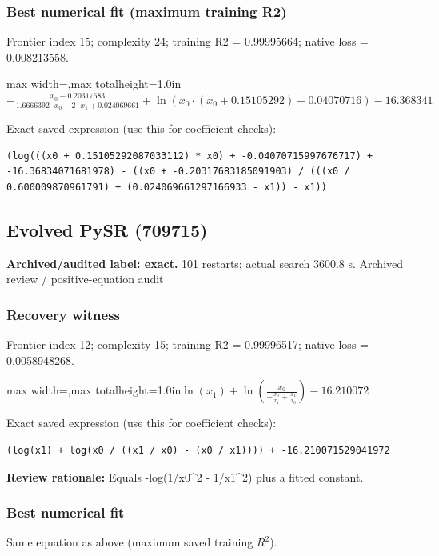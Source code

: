 \documentclass[10pt,letterpaper,landscape]{article}
\begin{document}
\begin{minipage}[t]{0.485\textwidth}
\subsubsection*{Best numerical fit (maximum training R2)}
Frontier index 15; complexity 24; training R2 = 0.99995664; native loss = 0.008213558.
\begin{center}\begin{adjustbox}{max width=\linewidth,max totalheight=1.0in}$\displaystyle - \frac{x_{0} - 0.20317683}{1.6666392 \cdot x_{0} - 2 \cdot x_{1} + 0.024069661} + \ln{\left(x_{0} \cdot \left(x_{0} + 0.15105292\right) - 0.04070716 \right)} - 16.368341$\end{adjustbox}\end{center}
{\scriptsize Exact saved expression (use this for coefficient checks):}
\begin{lstlisting}
(log(((x0 + 0.15105292087033112) * x0) + -0.04070715997676717) + -16.36834071681978) - ((x0 + -0.20317683185091903) / (((x0 / 0.600009870961791) + (0.024069661297166933 - x1)) - x1))
\end{lstlisting}
\end{minipage}\hfill
\begin{minipage}[t]{0.485\textwidth}
\subsection*{Evolved PySR (709715)}
\textbf{Archived/audited label: exact.} 101 restarts; actual search 3600.8 s.
{\small Archived review / positive-equation audit}
\subsubsection*{Recovery witness}
Frontier index 12; complexity 15; training R2 = 0.99996517; native loss = 0.0058948268.
\begin{center}\begin{adjustbox}{max width=\linewidth,max totalheight=1.0in}$\displaystyle \ln{\left(x_{1} \right)} + \ln{\left(\frac{x_{0}}{- \frac{x_{0}}{x_{1}} + \frac{x_{1}}{x_{0}}} \right)} - 16.210072$\end{adjustbox}\end{center}
{\scriptsize Exact saved expression (use this for coefficient checks):}
\begin{lstlisting}
(log(x1) + log(x0 / ((x1 / x0) - (x0 / x1)))) + -16.210071529041972
\end{lstlisting}
{\small\textbf{Review rationale:} Equals -log(1/x0\textasciicircum{}2 - 1/x1\textasciicircum{}2) plus a fitted constant.}
\subsubsection*{Best numerical fit}
Same equation as above (maximum saved training $R^2$).
\end{minipage}
\clearpage{}\label{rydberg-10009}
\end{document}
